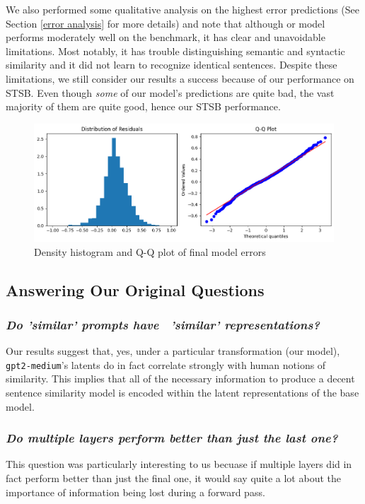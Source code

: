 \documentclass{article}
\begin{document}
We also performed some qualitative analysis on the highest error predictions (See Section \ref{error analysis} for more details) and note that although or model performs moderately well on the benchmark, it has clear and unavoidable limitations. Most notably, it has trouble distinguishing semantic and syntactic similarity and it did not learn to recognize identical sentences. Despite these limitations, we still consider our results a success because of our performance on STSB. Even though \textit{some} of our model's predictions are quite bad, the vast majority of them are quite good, hence our STSB performance.


\begin{figure}[!htb]
    \centering
    \includegraphics[width=.90\linewidth]{residuals.png}
    \caption{Density histogram and Q-Q plot of final model errors}
    \label{fig:residuals}
\end{figure}    


\subsection{Answering Our Original Questions}
\subsubsection*{\textit{Do 'similar' prompts have \ 'similar' representations?}}
Our results suggest that, yes, under a particular transformation (our model), \verb|gpt2-medium|'s latents do in fact correlate strongly with human notions of similarity. This implies that all of the necessary information to produce a decent sentence similarity model is encoded within the latent representations of the base model.

\subsubsection*{\textit{Do multiple layers perform better than just the last one?}}
This question was particularly interesting to us becuase if multiple layers did in fact perform better than just the final one, it would say quite a lot about the importance of information being lost during a forward pass.
\end{document}

